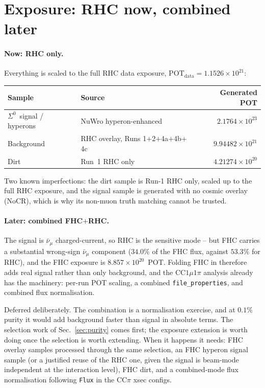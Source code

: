 \documentclass[11pt,a4paper]{article}
\newcommand{\Szero}{\ensuremath{\Sigma^{0}}}
\newcommand{\numubar}{\ensuremath{\bar{\nu}_\mu}}
\begin{document}
\section{Exposure: RHC now, combined later}
\label{sec:exposure}

\paragraph{Now: RHC only.} Everything is scaled to the full RHC data exposure,
$\mathrm{POT}_{\mathrm{data}} = 1.1526\times10^{21}$:

\begin{center}
\begin{tabular}{llr}
\toprule
Sample & Source & Generated POT \\
\midrule
\Szero\ signal / hyperons & NuWro hyperon-enhanced & $2.1764\times10^{23}$ \\
Background   & RHC overlay, Runs 1$+$2$+$4a$+$4b$+$4c & $9.94482\times10^{21}$ \\
Dirt         & Run~1 RHC only & $4.21274\times10^{20}$ \\
\bottomrule
\end{tabular}
\end{center}

\noindent Two known imperfections: the dirt sample is Run-1 RHC only, scaled up to
the full RHC exposure, and the signal sample is generated with no cosmic overlay
(NoCR), which is why its non-muon truth matching cannot be trusted.

\paragraph{Later: combined FHC$+$RHC.} The signal is $\numubar$ charged-current,
so RHC is the sensitive mode -- but FHC carries a substantial wrong-sign
$\numubar$ component ($34.0\%$ of the FHC flux, against $53.3\%$ for RHC), and the
FHC exposure is $8.857\times10^{20}$~POT. Folding FHC in therefore adds real signal
rather than only background, and the CC$1\mu1\pi$ analysis already has the
machinery: per-run POT scaling, a combined \texttt{file\_properties}, and combined
flux normalisation.

Deferred deliberately. The combination is a normalisation exercise, and at $0.1\%$
purity it would add background faster than signal in absolute terms. The selection
work of Sec.~\ref{sec:purity} comes first; the exposure extension is worth doing
once the selection is worth extending. When it happens it needs: FHC overlay
samples processed through the same selection, an FHC hyperon signal sample (or a
justified reuse of the RHC one, given the signal is beam-mode independent at the
interaction level), FHC dirt, and a combined-mode flux normalisation following
\texttt{Flux} in the CC$\pi$ xsec configs.
\end{document}
